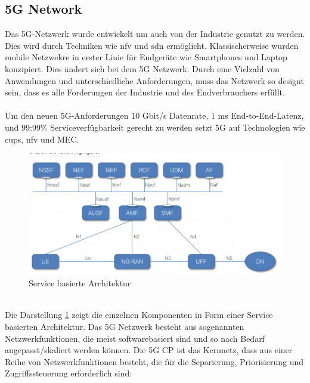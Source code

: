 \documentclass[runningheads]{llncs}
\numberwithin{figure}{section}
\begin{document}
\subsection{5G Network}
\label{subsec:5G Network}
Das 5G-Netzwerk wurde entwickelt um auch von der Industrie genutzt zu werden.
Dies wird durch Techniken wie \acrlong{nfv} und \acrlong{sdn} ermöglicht.
Klassischerweise wurden mobile Netzwekre in erster Linie für Endgeräte wie Smartphones und Laptop konzipiert. 
Dies ändert sich bei dem 5G Netzwerk. Durch eine Vielzahl von Anwendungen und unterschiedliche Anforderungen,
muss das Netzwerk so designt sein, dass es alle Forderungen der Industrie und des Endverbrauchers erfüllt. 
\\
\\
Um den neuen 5G-Anforderungen 10 Gbit/s Datenrate, 1 ms End-to-End-Latenz,  und 99:99\% 
Serviceverfügbarkeit gerecht zu werden setzt 5G auf Technologien wie \acrfull{cups}, \acrfull{nfv} und MEC.
\begin{figure}
  \includegraphics[width=\linewidth]{images/ServiceBased5g.png}
  \caption{Service basierte Architektur}
  \label{fig:ServiceBased5g}
\end{figure}
\\
Die Darstellung \ref{fig:ServiceBased5g} zeigt die einzelnen Komponenten in Form einer Service basierten Architektur.  \cite{5GCoreNetwork2017}
Das 5G Netzwerk besteht aus sogenannten Netzwerkfunktionen, die meist softwarebasiert sind und so nach Bedarf angepasst/skaliert werden können.
Die 5G CP ist das Kernnetz, dass aus einer Reihe von Netzwerkfunktionen besteht, 
die für die Separierung, Priorisierung und Zugriffssteuerung erforderlich sind:
\end{document}
